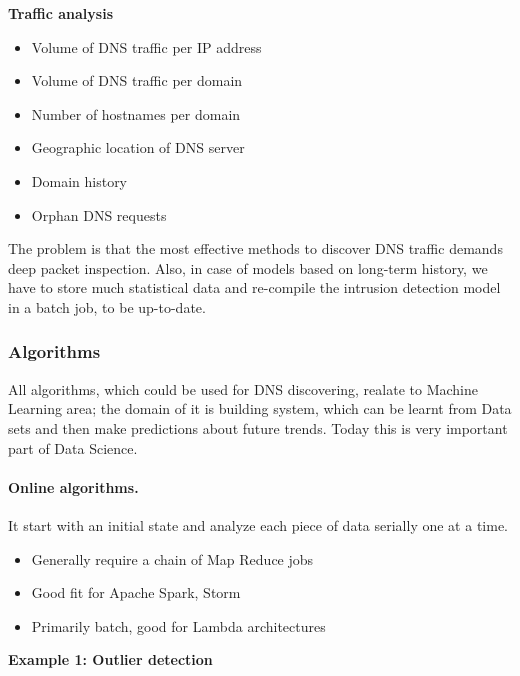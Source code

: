 \documentclass[10pt, a5paper]{article}
\begin{document}
\textbf{Traffic analysis}

\begin{itemize}
  \item Volume of DNS traffic per IP address
  \item Volume of DNS traffic per domain
  \item Number of hostnames per domain
  \item Geographic location of DNS server
  \item Domain history
  \item Orphan DNS requests
\end{itemize}

The problem is that the most effective methods to discover DNS traffic demands deep packet inspection. Also, in case of models  based on long-term history, we have to store much statistical data and re-compile the intrusion detection model in a batch job, to be up-to-date.

\subsubsection*{Algorithms}

All algorithms, which could be used for DNS discovering, realate to Machine Learning area; the domain of it is building system, which can be learnt from Data sets and then make predictions about future trends. Today this is very important part of Data Science.

\paragraph{Online algorithms.}

It start with an initial state and analyze each piece of data serially one at a time.

\begin{itemize}
  \item Generally require a chain of Map Reduce jobs
  \item Good fit for Apache Spark, Storm
  \item Primarily batch, good for Lambda architectures
\end{itemize}

\textbf{Example 1: Outlier detection}
\end{document}

